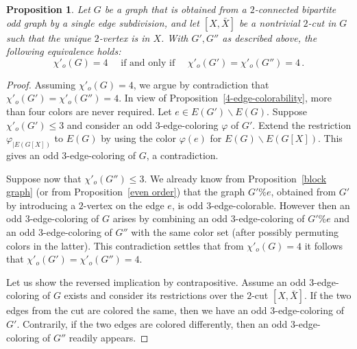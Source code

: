 \documentclass[a4paper,12pt]{article}
\newtheorem{proposition}[theorem]{Proposition}
\numberwithin{equation}{section}
\begin{document}
\begin{proposition}
    \label{glue}
Let $G$ be a graph that is obtained from a $2$-connected bipartite odd graph by a single edge subdivision, and let $[X,\bar{X}]$ be a nontrivial $2$-cut in $G$ such that the unique $2$-vertex is in $X$. With $G',G''$ as described above, the following equivalence holds:
\begin{equation*}
\chi'_o(G)=4 \quad\text{ if and only if }\quad \chi'_o(G')=\chi'_o(G'')=4\,.
\end{equation*}
\end{proposition}
\begin{proof}
Assuming $\chi'_o(G)=4$, we argue by contradiction that $\chi'_o(G')=\chi'_o(G'')=4$. In view of Proposition~\ref{4-edge-colorability}, more than four colors are never required. Let $e\in E(G')\backslash E(G)$. Suppose $\chi'_o(G')\leq3$ and consider an odd $3$-edge-coloring $\varphi$ of $G'$. Extend the restriction $\varphi_{|E(G[X])}$ to $E(G)$ by using the color $\varphi(e)$ for $E(G)\backslash E(G[X])$. This gives an odd $3$-edge-coloring of $G$, a contradiction.

Suppose now that $\chi'_o(G'')\leq3$. We already know from Proposition~\ref{block graph} (or from Proposition~\ref{even order}) that the graph $G'\%e$, obtained from $G'$ by introducing a $2$-vertex on the edge $e$, is odd $3$-edge-colorable. However then an odd $3$-edge-coloring of $G$ arises by combining an odd $3$-edge-coloring of $G'\%e$ and an odd $3$-edge-coloring of $G''$ with the same color set (after possibly permuting colors in the latter). This contradiction settles that from $\chi'_o(G)=4$ it follows that  $\chi'_o(G')=\chi'_o(G'')=4$.

Let us show the reversed implication by contrapositive. Assume an odd $3$-edge-coloring of $G$ exists and consider its restrictions over the $2$-cut $[X,\bar{X}]$. If the two edges from the cut are colored the same, then we have an odd $3$-edge-coloring of $G'$. Contrarily, if the two edges are colored differently, then an odd $3$-edge-coloring of $G''$ readily appears.
\end{proof}

\end{document}
